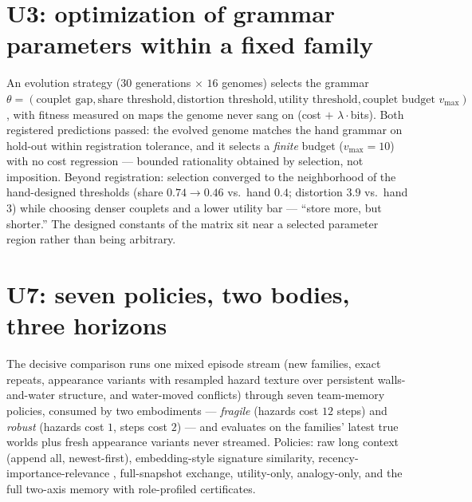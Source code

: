 \documentclass{article}
\begin{document}
\section{U3: optimization of grammar parameters within a fixed family}
\label{p5:sec:u3}

An evolution strategy ($30$ generations $\times$ $16$ genomes)
selects the grammar $\theta = (\text{couplet gap},
\text{share threshold}, \text{distortion threshold},
\text{utility threshold}, \text{couplet budget } v_{\max})$, with
fitness measured on maps the genome never sang on (cost $+$
$\lambda\cdot$bits). Both registered predictions passed: the evolved
genome matches the hand grammar on hold-out within registration
tolerance, and it selects a \emph{finite} budget ($v_{\max} = 10$)
with no cost regression --- bounded rationality obtained by
selection, not imposition. Beyond registration: selection converged
to the neighborhood of the hand-designed thresholds (share
$0.74 \to 0.46$ vs.\ hand $0.4$; distortion $3.9$ vs.\ hand $3$)
while choosing denser couplets and a lower utility bar --- ``store
more, but shorter.'' The designed constants of the matrix sit near a
selected parameter region rather than being arbitrary.


\section{U7: seven policies, two bodies, three horizons}
\label{p5:sec:u7}

The decisive comparison runs one mixed episode stream (new families,
exact repeats, appearance variants with resampled hazard texture over
persistent walls-and-water structure, and water-moved conflicts)
through seven team-memory policies, consumed by two embodiments ---
\emph{fragile} (hazards cost $12$ steps) and \emph{robust} (hazards
cost $1$, steps cost $2$) --- and evaluates on the families' latest
true worlds plus fresh appearance variants never streamed. Policies:
raw long context (append all, newest-first), embedding-style
signature similarity, recency-importance-relevance
\citep{genagents2023}, full-snapshot exchange, utility-only,
analogy-only, and the full two-axis memory with role-profiled
certificates.
\end{document}
